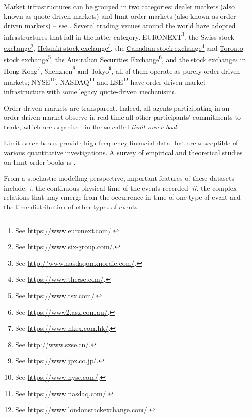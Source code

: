 Market infrastructures can be grouped in two categories:
dealer markets (also known as quote-driven markets)
and
limit order markets (also known as order-driven markets)
-- see \citealp[Chapter 1]{FPR13mar}.
Several trading venues around the world have adopted infrastructures that fall in the latter category.
\href{https://www.euronext.com/}{EURONEXT}\footnote{See
\url{https://www.euronext.com/}.},
the
\href{https://www.six-group.com/}{Swiss stock exchange}\footnote{See
\url{https://www.six-group.com/}.},
\href{http://www.nasdaqomxnordic.com/}{Helsinki stock exchange}\footnote{See
\url{http://www.nasdaqomxnordic.com/}.},
the
\href{https://www.thecse.com/}{Canadian stock exchange}\footnote{See
\url{https://www.thecse.com/}.}
and
\href{https://www.tsx.com/}{Toronto stock exchange}\footnote{See
\url{https://www.tsx.com/}.},
the
\href{https://www2.asx.com.au/}{Australian Securities Exchange}\footnote{See
\url{https://www2.asx.com.au/}.},
and the stock exchanges in
\href{https://www.hkex.com.hk/}{Hong Kong}\footnote{See
\url{https://www.hkex.com.hk/}.},
\href{http://www.szse.cn/}{Shenzhen}\footnote{See
\url{http://www.szse.cn/}.}
and
\href{https://www.jpx.co.jp/}{Tokyo}\footnote{See
\url{https://www.jpx.co.jp/}.},
all of them operate as purely order-driven markets;
\href{https://www.nyse.com/}{NYSE}\footnote{See
\url{https://www.nyse.com/}.},
\href{https://www.nasdaq.com/}{NASDAQ}\footnote{See
\url{https://www.nasdaq.com/}.}
and
\href{https://www.londonstockexchange.com/}{LSE}\footnote{See
\url{https://www.londonstockexchange.com/}.}
have order-driven market infrastructure
with some legacy quote-driven mechanisms.

Order-driven markets are transparent.
Indeed,
all agents participating in an order-driven market observe in real-time all other participants'
commitments to trade,
which are organised in the so-called \emph{limit order book}.

Limit order books provide high-frequency financial data that are susceptible of various
quantitative investigations.
A survey of empirical and theoretical studies on limit order books is \cite{GPWMFH13lim}.

From a stochastic modelling perspective, important features of these datasets include:
\emph{i.} the continuous physical time of the events recorded;
\emph{ii.} the complex relations that may emerge from the occurrence in time
of one type of event and the time distribution of other types of events.

